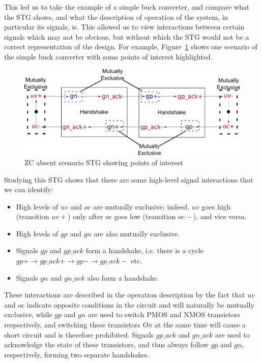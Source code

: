 \documentclass[british,compsoc]{IEEEtran}
\newcommand{\noun}[1]{\textsc{#1}}
\begin{document}
This led us to take the example of a simple buck converter, and compare what
the STG shows, and what the description of operation of the system, in
particular its signals, is. This allowed us to view interactions between
certain signals which may not be obvious, but without which the STG would not
be a correct representation of the design. For example,
Figure~\ref{fig:stg-breakdown} shows one scenario of the simple buck converter
with some points of interest highlighted.

\begin{figure}[h]
\begin{centering}
\includegraphics[scale=0.225]{Images/stg-breakdown}
\par
\protect\caption{\label{fig:stg-breakdown}ZC absent scenario STG showing points of interest}
\par\end{centering}
\end{figure}

Studying this STG shows that there are some high-level signal interactions that
we can identify:
\begin{itemize}
\item High levels of $uv$ and $oc$ are mutually exclusive; indeed, $uv$ goes
high (transition $uv+$) only after $oc$ goes low (transition $oc-$), and vice
versa.
\item High levels of $gp$ and $gn$ are also mutually exclusive.
\item Signals $gp$ and $gp\_ack$ form a handshake, i.e. there is a cycle
$gp+ \rightarrow gp\_ack+ \rightarrow gp- \rightarrow gp\_ack-$ etc.
\item Signals $gn$ and $gn\_ack$ also form a handshake.
\end{itemize}

These interactions are described in the operation description by the fact that
$uv$ and $oc$ indicate opposite conditions in the circuit and will naturally be
mutually exclusive, while $gp$ and $gn$ are used to switch PMOS and NMOS
transistors respectively, and switching these transistors \noun{On} at the same
time will cause a short circuit and is therefore prohibited. Signals $gp\_ack$
and $gn\_ack$ are used to acknowledge the state of these transistors, and thus
always follow $gp$ and $gn$, respectively, forming two separate handshakes.
\end{document}

